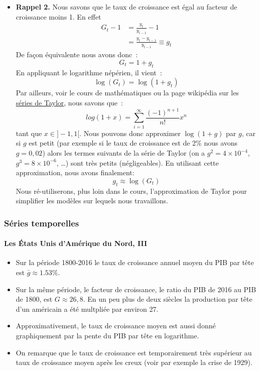 \documentclass[10pt,notheorems]{beamer}
\theoremstyle{plain}
\theoremstyle{definition} %
\newenvironment{notes}
{\bgroup \justifying\bgroup\tiny\begin{spacing}{1.0}}
  {\end{spacing}\egroup\egroup}
\begin{document}
\begin{notes}
  \begin{itemize}

  \item \textbf{Rappel 2.} Nous savons que le taux de croissance est égal au facteur de croissance moins 1. En effet
    \[
      \begin{split}
        G_t-1 &= \frac{y_t}{y_{t-1}}-1\\
        &= \frac{y_t-y_{t-1}}{y_{t-1}} \equiv g_t
      \end{split}
    \]
    De façon équivalente nous avons donc~:
    \[
      G_t = 1+g_t
    \]
    En appliquant le logarithme népérien, il vient~:
    \[
      \log (G_t) = \log(1+g_t)
    \]
    Par ailleurs, voir le cours de mathématiques ou la page wikipédia sur les \href{https://fr.wikipedia.org/wiki/S%C3%A9rie_de_Taylor}{séries de Taylor}, nous savons que~:
    \[
      log(1+x) = \sum_{i=1}^{\infty}\frac{(-1)^{n+1}}{n!}x^n
    \]
    tant que $x\in]-1,1[$. Nous pouvons donc approximer $\log(1+g)$ par $g$, car si $g$ est petit (par exemple si le taux de croissance est de 2\% nous avons $g=0,02$) alors les termes suivants de la série de Taylor (on a $g^2=4\times 10^{-4}$, $g^3 = 8\times 10^{-6}$, \ldots) sont très petits (négligeables). En utilisant cette approximation, nous avons finalement:
    \[
      g_t \approx \log(G_t)
    \]
    Nous ré-utiliserons, plus loin dans le cours, l'approximation de Taylor pour simplifier les modèles sur lequels nous travaillons.
  \end{itemize}
\end{notes}



\begin{frame}
  \frametitle{Séries temporelles}
  \framesubtitle{Les États Unis d'Amérique du Nord, III}

  \begin{itemize}
  \item Sur la période 1800-2016 le taux de croissance annuel moyen du PIB par tête est $\bar g \approx 1.53\%$.\newline

  \item Sur la même période, le facteur de croissance, le ratio du PIB de 2016 au PIB de 1800, est $G \approx 26,8$. En un peu plus de deux siècles la production par tête d'un américain a été multpliée par environ 27.\newline

  \item Approximativement, le taux de croissance moyen est aussi donné graphiquement par la pente du PIB par tête en logarithme.\newline

  \item On remarque que le taux de croissance est temporairement très supérieur au taux de croissance moyen après les creux (voir par exemple la crise de 1929).
  \end{itemize}

\end{frame}
\end{document}
